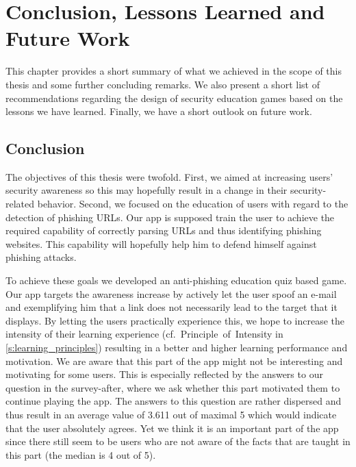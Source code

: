 
\section{Conclusion, Lessons Learned and Future Work}
\label{s:conclusion}

This chapter provides a short summary of what we achieved in the scope of this thesis and some further concluding remarks.
We also present a short list of recommendations regarding the design of security education games based on the lessons we have learned.
Finally, we have a short outlook on future work.
\subsection{Conclusion}
The objectives of this thesis were twofold.
First, we aimed at increasing users' security awareness so this may hopefully result in a change in their security-related behavior.
Second, we focused on the education of users with regard to the detection of phishing URLs. 
Our app is supposed train the user to achieve the required capability of correctly parsing URLs and thus identifying phishing websites.
This capability will hopefully help him to defend himself against phishing attacks.

To achieve these goals we developed an anti-phishing education quiz based game.
Our app targets the awareness increase by actively let the user spoof an e-mail and exemplifying him that a link does not necessarily lead to the target that it displays.
By letting the users practically experience this, we hope to increase the intensity of their learning experience (cf.~Principle~of~Intensity in \autoref{s:learning_principles}) resulting in a better and higher learning performance and motivation. We are aware that this part of the app might not be interesting and motivating for some users.
This is especially reflected by the answers to our question in the survey-after, where we ask whether this part motivated them to continue playing the app. 
The answers to this question are rather dispersed and thus result in an average value of 3.611 out of maximal 5 which would indicate that the user absolutely agrees.
Yet we think it is an important part of the app since there still seem to be users who are not aware of the facts that are taught in this part (the median is 4 out of 5).

